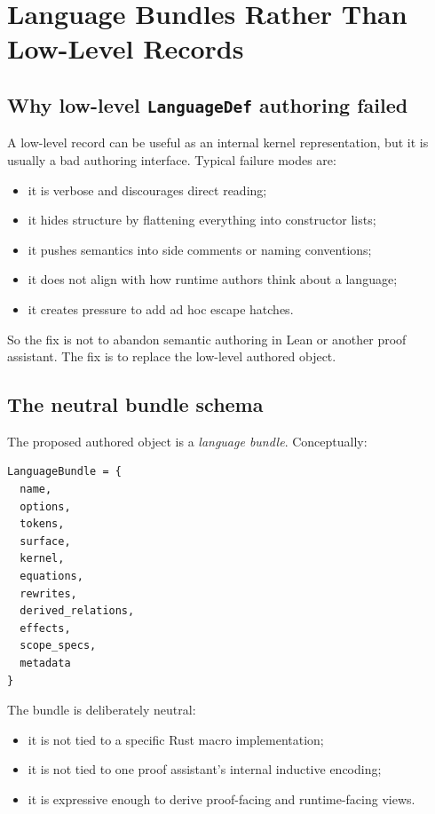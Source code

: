 \documentclass[11pt]{article}
\begin{document}
\section{Language Bundles Rather Than Low-Level Records}

\subsection{Why low-level \texttt{LanguageDef} authoring failed}

A low-level record can be useful as an internal kernel representation, but it is usually a bad authoring interface. Typical failure modes are:
\begin{itemize}[leftmargin=2em]
  \item it is verbose and discourages direct reading;
  \item it hides structure by flattening everything into constructor lists;
  \item it pushes semantics into side comments or naming conventions;
  \item it does not align with how runtime authors think about a language;
  \item it creates pressure to add ad hoc escape hatches.
\end{itemize}

So the fix is not to abandon semantic authoring in Lean or another proof assistant. The fix is to replace the low-level authored object.

\subsection{The neutral bundle schema}

The proposed authored object is a \emph{language bundle}. Conceptually:

\begin{lstlisting}[style=code]
LanguageBundle = {
  name,
  options,
  tokens,
  surface,
  kernel,
  equations,
  rewrites,
  derived_relations,
  effects,
  scope_specs,
  metadata
}
\end{lstlisting}

The bundle is deliberately neutral:
\begin{itemize}[leftmargin=2em]
  \item it is not tied to a specific Rust macro implementation;
  \item it is not tied to one proof assistant's internal inductive encoding;
  \item it is expressive enough to derive proof-facing and runtime-facing views.
\end{itemize}
\end{document}
